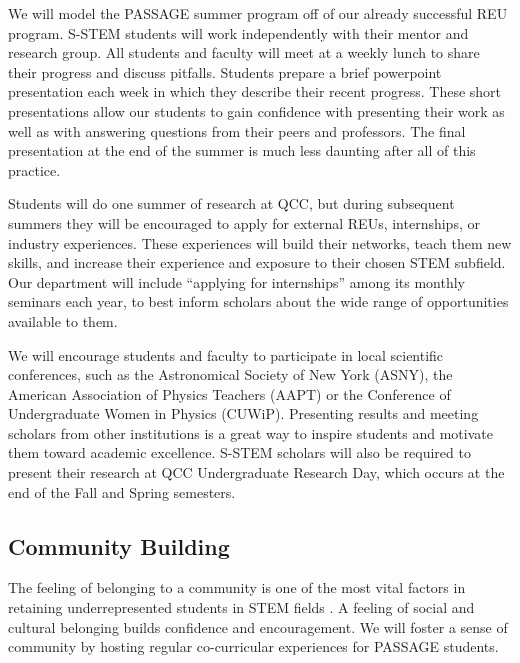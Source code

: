 \documentclass[12pt]{article}
\begin{document}
We will model the PASSAGE summer program off of our already successful REU program.  S-STEM students will work independently with their mentor and research group.  All students and faculty will meet at a weekly lunch to share their progress and discuss pitfalls.  Students prepare a brief powerpoint presentation each week in which they describe their recent progress.  These short presentations allow our students to gain confidence with presenting their work as well as with answering questions from their peers and professors.  The final presentation at the end of the summer is much less daunting after all of this practice.  

Students will do one summer of research at QCC, but during subsequent summers they will be encouraged to apply for external REUs, internships, or industry experiences.  These experiences will build their networks, teach them new skills, and  increase their experience and exposure to their chosen STEM subfield.  Our department will include ``applying for internships'' among its monthly seminars each year, to best inform scholars about the wide range of opportunities available to them.  

We will encourage students and faculty to participate in local scientific conferences, such as the Astronomical Society of New York (ASNY), the American Association of Physics Teachers (AAPT) or the Conference of Undergraduate Women in Physics (CUWiP).  Presenting results and meeting scholars from other institutions is a great way to inspire students and motivate them toward academic excellence.  S-STEM scholars will also be required to present their research at QCC Undergraduate Research Day, which occurs at the end of the Fall and Spring semesters.


\vspace{-5mm}

\subsection{\normalsize{Community Building}}
\vspace{-2mm}
The feeling of belonging to a community is one of the most vital factors in retaining underrepresented students in STEM fields \citep{dyer14,Gonzales,Burrows}.  A feeling of social and cultural belonging builds confidence and encouragement.  We will foster a sense of community by hosting regular co-curricular experiences for PASSAGE students.  
\end{document}
